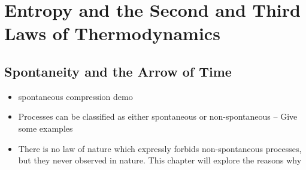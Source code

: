\documentclass[12pt, openany, letterpaper]{memoir}
\begin{document}
\chapter{Entropy and the Second and Third Laws of Thermodynamics}
\section*{Spontaneity and the Arrow of Time}
\begin{itemize}
	\item spontaneous compression demo
	\item Processes can be classified as either spontaneous or non-spontaneous -- Give some examples
	\item There is no law of nature which expressly forbids non-spontaneous processes, but they never observed in nature. This chapter will explore the reasons why
\end{itemize}
\end{document}
